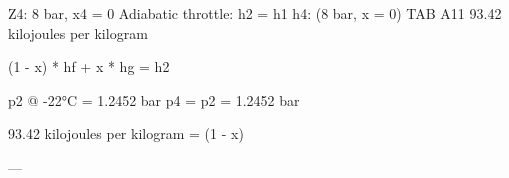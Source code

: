 Z4: 8 bar, x4 = 0  
Adiabatic throttle: h2 = h1  
h4: (8 bar, x = 0) TAB A11  
93.42 kilojoules per kilogram  

(1 - x) * hf + x * hg = h2  

p2 @ -22°C = 1.2452 bar  
p4 = p2 = 1.2452 bar  

93.42 kilojoules per kilogram = (1 - x)  

---